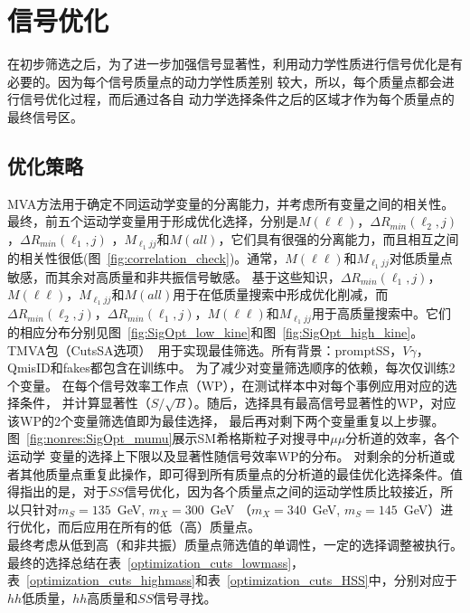 \chapter{信号优化}\label{chap:signal_optimization}
在初步筛选之后，为了进一步加强信号显著性，利用动力学性质进行信号优化是有必要的。因为每个信号质量点的动力学性质差别
较大，所以，每个质量点都会进行信号优化过程，而后通过各自
动力学选择条件之后的区域才作为每个质量点的最终信号区。

\section{优化策略}
MVA方法用于确定不同运动学变量的分离能力，并考虑所有变量之间的相关性。最终，前五个运动学变量用于形成优化选择，分别是$M(\ell\ell)$，$\Delta R_{min}(\ell_{2}, j)$，$\Delta R_{min}(\ell_{1}, j)$ ，$ M_{\ell_{1} jj}$和$M(all)$，它们具有很强的分离能力，而且相互之间的相关性很低(图~\ref{fig:correlation_check})。通常，$M(\ell\ell)$和$ M_{\ell_{1} jj} $对低质量点敏感，而其余对高质量和非共振信号敏感。
基于这些知识，$\Delta R_{min}(\ell_{1}, j)$，$M(\ell\ell)$，$ M_{\ell_{1}jj}$和$M(all)$用于在低质量搜索中形成优化削减，而$\Delta R_{min}(\ell_{2}, j)$，$\Delta R_{min}(\ell_{1}, j)$，$M(\ell\ell)$和$M_{\ell_{1}jj}$用于高质量搜索中。它们的相应分布分别见图~\ref{fig:SigOpt_low_kine}和图~\ref{fig:SigOpt_high_kine}。\\
TMVA包（CutsSA选项）~\cite{Hocker:2007ht}用于实现最佳筛选。所有背景：promptSS，$V\gamma$，QmisID和fakes都包含在训练中。
为了减少对变量筛选顺序的依赖，每次仅训练2个变量。
在每个信号效率工作点（WP），在测试样本中对每个事例应用对应的选择条件，
并计算显著性（$S/\sqrt{B}$）。随后，选择具有最高信号显著性的WP，对应该WP的2个变量筛选值即为最佳选择，
最后再对剩下两个变量重复以上步骤。图~\ref{fig:nonres:SigOpt_mumu}展示SM希格斯粒子对搜寻中$\mu\mu$分析道的效率，各个运动学
变量的选择上下限以及显著性随信号效率WP的分布。
对剩余的分析道或者其他质量点重复此操作，即可得到所有质量点的分析道的最佳优化选择条件。值得指出的是，对于$SS$信号优化，因为各个质量点之间的运动学性质比较接近，所以只针对$m_S=135$~GeV, $m_X=300$~GeV （$m_X=340$~GeV, $m_S=145$~GeV）进行优化，而后应用在所有的低（高）质量点。 \\
最终考虑从低到高（和非共振）质量点筛选值的单调性，一定的选择调整被执行。最终的选择总结在表~\ref{optimization_cuts_lowmass}，表~\ref {optimization_cuts_highmass}和表~\ref{optimization_cuts_HSS}中，分别对应于$hh$低质量，$hh$高质量和$SS$信号寻找。

